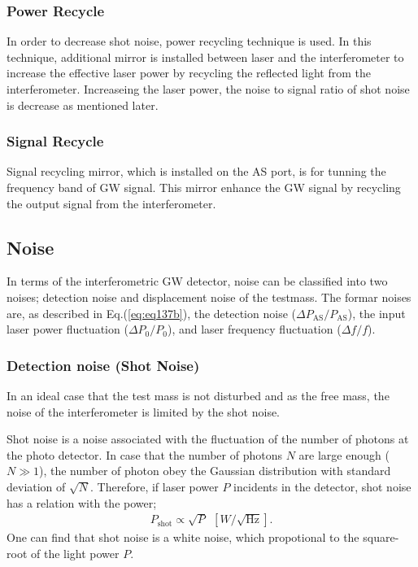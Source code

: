\subsubsection{Power Recycle}
In order to decrease shot noise, power recycling technique is used. In this technique, additional mirror is installed between laser and the interferometer to increase the effective laser power by recycling the reflected light from the interferometer. Increaseing the laser power, the noise to signal ratio of shot noise is decrease as mentioned later.

\subsubsection{Signal Recycle}
Signal recycling mirror, which is installed on the AS port, is for tunning the frequency band of GW signal. This mirror enhance the GW signal by recycling the output signal from the interferometer.

\subsection{Noise}
In terms of the interferometric GW detector, noise can be classified into two noises; detection noise and displacement noise of the testmass. The formar noises are, as described in Eq.(\ref{eq:eq137b}), the detection noise  ($\Delta{P_{\mathrm{AS}}}/P_{\mathrm{AS}}$), the input laser power fluctuation  ($\Delta{P_0}/P_0$), and laser frequency fluctuation ($\Delta{f}/f$).

\subsubsection{Detection noise (Shot Noise)}
In an ideal case that the test mass is not disturbed and as the free mass, the noise of the interferometer is limited by the shot noise.

Shot noise is a noise associated with the fluctuation of the number of photons at the photo detector. In case that the number of photons $N$ are large enough ($N\gg1$), the number of photon obey the Gaussian distribution with standard deviation of $\sqrt{N}$. Therefore, if laser power $P$ incidents in the detector, shot noise has a relation with the power;
\begin{eqnarray}
  P_{\mathrm{shot}} \propto \sqrt{P}\ \ [W/\sqrt{\mathrm{Hz}}].  \label{eq:eq136}
\end{eqnarray}
One can find that shot noise is a white noise, which propotional to the square-root of the light power $P$.

